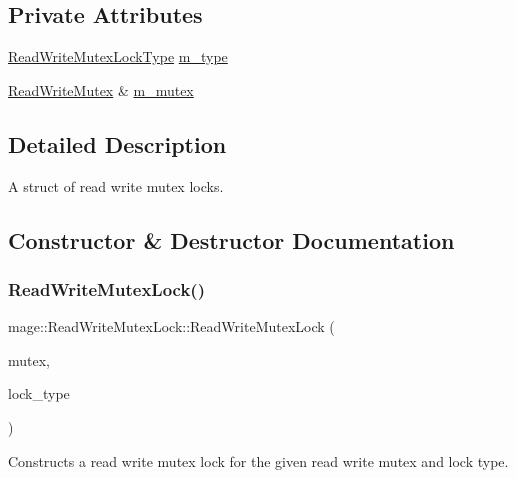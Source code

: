 \subsection*{Private Attributes}
\begin{DoxyCompactItemize}
\item 
\hyperlink{namespacemage_afd76fcca37ce5c5b2227671290973c74}{Read\+Write\+Mutex\+Lock\+Type} \hyperlink{structmage_1_1_read_write_mutex_lock_aa117ffe94f6850ddc91ad6d1389fb6e2}{m\+\_\+type}
\item 
\hyperlink{classmage_1_1_read_write_mutex}{Read\+Write\+Mutex} \& \hyperlink{structmage_1_1_read_write_mutex_lock_a6ee9034fa984e11ec07c20ec77ab1bfe}{m\+\_\+mutex}
\end{DoxyCompactItemize}


\subsection{Detailed Description}
A struct of read write mutex locks. 

\subsection{Constructor \& Destructor Documentation}
\hypertarget{structmage_1_1_read_write_mutex_lock_a323e2f45646caa23c4ee21452c8f8d4a}{}\label{structmage_1_1_read_write_mutex_lock_a323e2f45646caa23c4ee21452c8f8d4a} 
\subsubsection{\texorpdfstring{Read\+Write\+Mutex\+Lock()}{ReadWriteMutexLock()}\hspace{0.1cm}{\footnotesize\ttfamily [1/2]}}
{\footnotesize\ttfamily mage\+::\+Read\+Write\+Mutex\+Lock\+::\+Read\+Write\+Mutex\+Lock (\begin{DoxyParamCaption}\item[{\hyperlink{classmage_1_1_read_write_mutex}{Read\+Write\+Mutex} \&}]{mutex,  }\item[{\hyperlink{namespacemage_afd76fcca37ce5c5b2227671290973c74}{Read\+Write\+Mutex\+Lock\+Type}}]{lock\+\_\+type }\end{DoxyParamCaption})}

Constructs a read write mutex lock for the given read write mutex and lock type.


